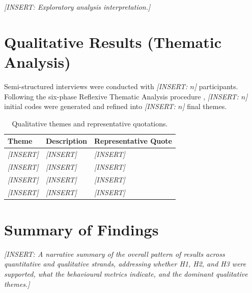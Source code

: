 \textit{[INSERT: Exploratory analysis interpretation.]}

\section{Qualitative Results (Thematic Analysis)}

Semi-structured interviews were conducted with \textit{[INSERT: $n$]} participants. Following the six-phase Reflexive Thematic Analysis procedure \citep{braun2022thematic}, \textit{[INSERT: $n$]} initial codes were generated and refined into \textit{[INSERT: $n$]} final themes.

\begin{table}[H]
\centering
\caption{Qualitative themes and representative quotations.}
\label{tab:themes}
\small
\begin{tabular}{@{}p{3cm}p{4cm}p{6cm}@{}}
\toprule
\textbf{Theme} & \textbf{Description} & \textbf{Representative Quote} \\
\midrule
\textit{[INSERT]} & \textit{[INSERT]} & \textit{[INSERT]} \\
\textit{[INSERT]} & \textit{[INSERT]} & \textit{[INSERT]} \\
\textit{[INSERT]} & \textit{[INSERT]} & \textit{[INSERT]} \\
\textit{[INSERT]} & \textit{[INSERT]} & \textit{[INSERT]} \\
\bottomrule
\end{tabular}
\end{table}

\section{Summary of Findings}

\textit{[INSERT: A narrative summary of the overall pattern of results across quantitative and qualitative strands, addressing whether H1, H2, and H3 were supported, what the behavioural metrics indicate, and the dominant qualitative themes.]}
